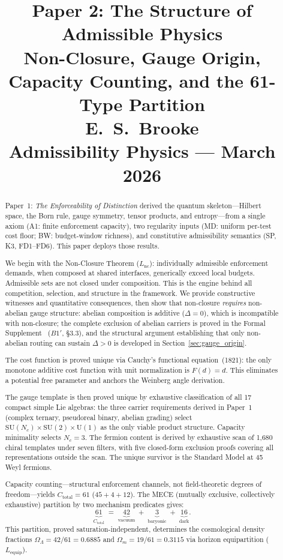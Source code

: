 \documentclass[11pt]{article}
\title{
  \textbf{Paper 2: The Structure of Admissible Physics}\\
  \large Non-Closure, Gauge Origin, Capacity Counting, and the 61-Type Partition\\
  \normalsize E.\ S.\ Brooke\\
  Admissibility Physics --- March 2026
}
\author{}
\date{}
\newcommand{\SU}{\mathrm{SU}}
\newcommand{\U}{\mathrm{U}}
\begin{document}
\maketitle

\begin{abstract}
\noindent
Paper~1: \emph{The Enforceability of Distinction} derived the quantum skeleton---Hilbert space, the Born rule, gauge symmetry, tensor products, and entropy---from a single axiom (A1: finite enforcement capacity), two regularity inputs (MD: uniform per-test cost floor; BW: budget-window richness), and constitutive admissibility semantics (SP, K3, FD1--FD6).  This paper deploys those results.

We begin with the Non-Closure Theorem ($L_{\mathrm{nc}}$): individually admissible enforcement demands, when composed at shared interfaces, generically exceed local budgets.  Admissible sets are not closed under composition.  This is the engine behind all competition, selection, and structure in the framework.  We provide constructive witnesses and quantitative consequences, then show that non-closure \emph{requires} non-abelian gauge structure: abelian composition is additive ($\Delta = 0$), which is incompatible with non-closure; the complete exclusion of abelian carriers is proved in the Formal Supplement~\cite{BrookeP2Supplement} ($B1'$, \S3.3), and the structural argument establishing that only non-abelian routing can sustain $\Delta > 0$ is developed in Section~\ref{sec:gauge_origin}.

The cost function is proved unique via Cauchy's functional equation~(1821): the only monotone additive cost function with unit normalization is $F(d) = d$.  This eliminates a potential free parameter and anchors the Weinberg angle derivation.

The gauge template is then proved unique by exhaustive classification of all 17 compact simple Lie algebras: the three carrier requirements derived in Paper~1~\cite{BrookePaper1} (complex ternary, pseudoreal binary, abelian grading) select $\SU(N_c) \times \SU(2) \times \U(1)$ as the only viable product structure.  Capacity minimality selects $N_c = 3$.  The fermion content is derived by exhaustive scan of 1{,}680 chiral templates under seven filters, with five closed-form exclusion proofs covering all representations outside the scan.  The unique survivor is the Standard Model at 45 Weyl fermions.

Capacity counting---structural enforcement channels, not field-theoretic degrees of freedom---yields $C_{\mathrm{total}} = 61$ ($45 + 4 + 12$).  The MECE (mutually exclusive, collectively exhaustive) partition by two mechanism predicates gives:
\begin{equation}
\underbrace{61}_{C_{\mathrm{total}}} \;=\; \underbrace{42}_{\text{vacuum}} \;+\; \underbrace{3}_{\text{baryonic}} \;+\; \underbrace{16}_{\text{dark}}.
\label{eq:mece_abstract}
\end{equation}
This partition, proved saturation-independent, determines the cosmological density fractions $\Omega_\Lambda = 42/61 = 0.6885$ and $\Omega_m = 19/61 = 0.3115$ via horizon equipartition ($L_{\mathrm{equip}}$).


\end{abstract}
\end{document}
